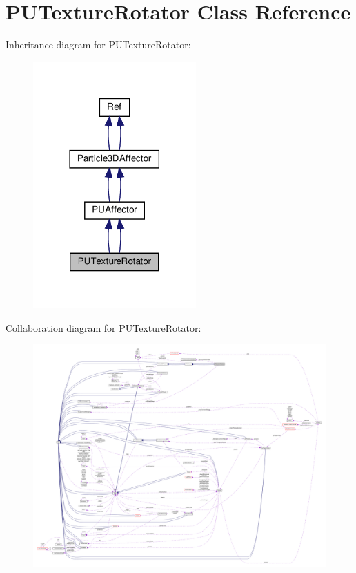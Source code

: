 \hypertarget{classPUTextureRotator}{}\section{P\+U\+Texture\+Rotator Class Reference}
\label{classPUTextureRotator}


Inheritance diagram for P\+U\+Texture\+Rotator\+:
\nopagebreak
\begin{figure}[H]
\begin{center}
\leavevmode
\includegraphics[width=177pt]{classPUTextureRotator__inherit__graph}
\end{center}
\end{figure}


Collaboration diagram for P\+U\+Texture\+Rotator\+:
\nopagebreak
\begin{figure}[H]
\begin{center}
\leavevmode
\includegraphics[width=350pt]{classPUTextureRotator__coll__graph}
\end{center}
\end{figure}
